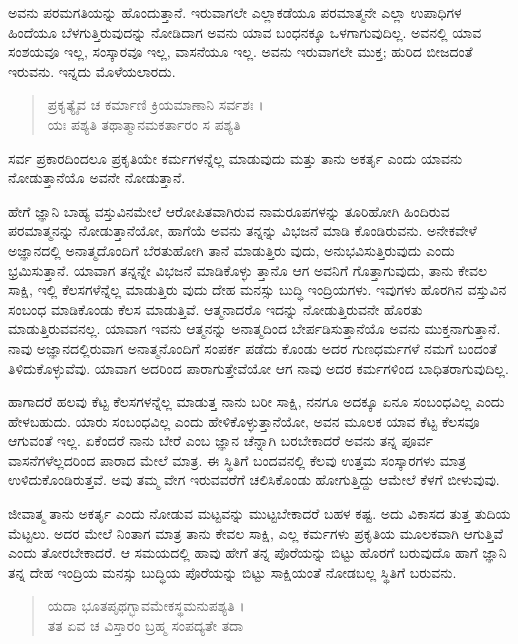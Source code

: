 ಅವನು ಪರಮಗತಿಯನ್ನು ಹೊಂದುತ್ತಾನೆ. ಇರುವಾಗಲೇ ಎಲ್ಲಾಕಡೆಯೂ ಪರಮಾತ್ಮನೇ ಎಲ್ಲಾ ಉಪಾಧಿಗಳ ಹಿಂದೆಯೂ ಬೆಳಗುತ್ತಿರುವುದನ್ನು ನೋಡಿದಾಗ ಅವನು ಯಾವ ಬಂಧನಕ್ಕೂ ಒಳಗಾಗುವುದಿಲ್ಲ. ಅವನಲ್ಲಿ ಯಾವ ಸಂಶಯವೂ ಇಲ್ಲ, ಸಂಸ್ಕಾರವೂ ಇಲ್ಲ, ವಾಸನೆಯೂ ಇಲ್ಲ. ಅವನು ಇರುವಾಗಲೇ ಮುಕ್ತ; ಹುರಿದ ಬೀಜದಂತೆ ಇರುವನು. ಇನ್ನದು ಮೊಳೆಯಲಾರದು.

\begin{verse}
ಪ್ರಕೃತ್ಯೈವ ಚ ಕರ್ಮಾಣಿ ಕ್ರಿಯಮಾಣಾನಿ ಸರ್ವಶಃ ।\\ಯಃ ಪಶ್ಯತಿ ತಥಾತ್ಮಾನಮಕರ್ತಾರಂ ಸ ಪಶ್ಯತಿ 
\end{verse}

{\small ಸರ್ವ ಪ್ರಕಾರದಿಂದಲೂ ಪ್ರಕೃತಿಯೇ ಕರ್ಮಗಳನ್ನೆಲ್ಲ ಮಾಡುವುದು ಮತ್ತು ತಾನು ಅಕರ್ತೃ ಎಂದು ಯಾವನು ನೋಡುತ್ತಾನೆಯೊ ಅವನೇ ನೋಡುತ್ತಾನೆ.}

ಹೇಗೆ ಜ್ಞಾನಿ ಬಾಹ್ಯ ವಸ್ತುವಿನಮೇಲೆ ಆರೋಪಿತವಾಗಿರುವ ನಾಮರೂಪಗಳನ್ನು ತೂರಿಹೋಗಿ ಹಿಂದಿರುವ ಪರಮಾತ್ಮನನ್ನು ನೋಡುತ್ತಾನೆಯೋ, ಹಾಗೆಯೆ ಅವನು ತನ್ನನ್ನು ವಿಭಜನೆ ಮಾಡಿ ಕೊಂಡಿರುವನು. ಅನೇಕವೇಳೆ ಅಜ್ಞಾನದಲ್ಲಿ ಅನಾತ್ಮದೊಂದಿಗೆ ಬೆರತುಹೋಗಿ ತಾನೆ ಮಾಡುತ್ತಿರು ವುದು, ಅನುಭವಿಸುತ್ತಿರುವುದು ಎಂದು ಭ್ರಮಿಸುತ್ತಾನೆ. ಯಾವಾಗ ತನ್ನನ್ನೇ ವಿಭಜನೆ ಮಾಡಿಕೊಳ್ಳು ತ್ತಾನೊ ಆಗ ಅವನಿಗೆ ಗೊತ್ತಾಗುವುದು, ತಾನು ಕೇವಲ ಸಾಕ್ಷಿ, ಇಲ್ಲಿ ಕೆಲಸಗಳೆನ್ನೆಲ್ಲ ಮಾಡುತ್ತಿರು ವುದು ದೇಹ ಮನಸ್ಸು ಬುದ್ಧಿ ಇಂದ್ರಿಯಗಳು. ಇವುಗಳು ಹೊರಗಿನ ವಸ್ತುವಿನ ಸಂಬಂಧ ಮಾಡಿಕೊಂಡು ಕೆಲಸ ಮಾಡುತ್ತಿವೆ. ಆತ್ಮನಾದರೊ ಇದನ್ನು ನೋಡುತ್ತಿರುವನೇ ಹೊರತು ಮಾಡುತ್ತಿರುವವನಲ್ಲ. ಯಾವಾಗ ಇವನು ಆತ್ಮನನ್ನು ಅನಾತ್ಮದಿಂದ ಬೇರ್ಪಡಿಸುತ್ತಾನೆಯೊ ಅವನು ಮುಕ್ತನಾಗುತ್ತಾನೆ. ನಾವು ಅಜ್ಞಾನದಲ್ಲಿರುವಾಗ ಅನಾತ್ಮನೊಂದಿಗೆ ಸಂಪರ್ಕ ಪಡೆದು ಕೊಂಡು ಅದರ ಗುಣಧರ್ಮಗಳೆ ನಮಗೆ ಬಂದಂತೆ ತಿಳಿದುಕೊಳ್ಳುವೆವು. ಯಾವಾಗ ಅದರಿಂದ ಪಾರಾಗುತ್ತೇವೆಯೋ ಆಗ ನಾವು ಅದರ ಕರ್ಮಗಳಿಂದ ಬಾಧಿತರಾಗುವುದಿಲ್ಲ.

ಹಾಗಾದರೆ ಹಲವು ಕೆಟ್ಟ ಕೆಲಸಗಳನ್ನೆಲ್ಲ ಮಾಡುತ್ತ ನಾನು ಬರೀ ಸಾಕ್ಷಿ, ನನಗೂ ಅದಕ್ಕೂ ಏನೂ ಸಂಬಂಧವಿಲ್ಲ ಎಂದು ಹೇಳಬಹುದು. ಯಾರು ಸಂಬಂಧವಿಲ್ಲ ಎಂದು ಹೇಳಿಕೊಳ್ಳುತ್ತಾನೆಯೋ, ಅವನ ಮೂಲಕ ಯಾವ ಕೆಟ್ಟ ಕೆಲಸವೂ ಆಗುವಂತೆ ಇಲ್ಲ. ಏಕೆಂದರೆ ನಾನು ಬೇರೆ ಎಂಬ ಜ್ಞಾನ ಚೆನ್ನಾಗಿ ಬರಬೇಕಾದರೆ ಅವನು ತನ್ನ ಪೂರ್ವ ವಾಸನೆಗಳೆಲ್ಲದರಿಂದ ಪಾರಾದ ಮೇಲೆ ಮಾತ್ರ. ಈ ಸ್ಥಿತಿಗೆ ಬಂದವನಲ್ಲಿ ಕೆಲವು ಉತ್ತಮ ಸಂಸ್ಕಾರಗಳು ಮಾತ್ರ ಉಳಿದುಕೊಂಡಿರುತ್ತವೆ. ಅವು ತಮ್ಮ ವೇಗ ಇರುವವರೆಗೆ ಚಲಿಸಿಕೊಂಡು ಹೋಗುತ್ತಿದ್ದು ಆಮೇಲೆ ಕೆಳಗೆ ಬೀಳುವುವು.

ಜೀವಾತ್ಮ ತಾನು ಅಕರ್ತೃ ಎಂದು ನೋಡುವ ಮಟ್ಟವನ್ನು ಮುಟ್ಟಬೇಕಾದರೆ ಬಹಳ ಕಷ್ಟ. ಅದು ವಿಕಾಸದ ತುತ್ತ ತುದಿಯ ಮೆಟ್ಟಲು. ಅದರ ಮೇಲೆ ನಿಂತಾಗ ಮಾತ್ರ ತಾನು ಕೇವಲ ಸಾಕ್ಷಿ, ಎಲ್ಲ ಕರ್ಮಗಳು ಪ್ರಕೃತಿಯ ಮೂಲಕವಾಗಿ ಆಗುತ್ತಿವೆ ಎಂದು ತೋರಬೇಕಾದರೆ. ಆ ಸಮಯದಲ್ಲಿ ಹಾವು ಹೇಗೆ ತನ್ನ ಪೊರೆಯನ್ನು ಬಿಟ್ಟು ಹೊರಗೆ ಬರುವುದೊ ಹಾಗೆ ಜ್ಞಾನಿ ತನ್ನ ದೇಹ ಇಂದ್ರಿಯ ಮನಸ್ಸು ಬುದ್ಧಿಯ ಪೊರೆಯನ್ನು ಬಿಟ್ಟು ಸಾಕ್ಷಿಯಂತೆ ನೋಡಬಲ್ಲ ಸ್ಥಿತಿಗೆ ಬರುವನು.

\begin{verse}
ಯದಾ ಭೂತಪೃಥಗ್ಭಾವಮೇಕಸ್ಥಮನುಪಶ್ಯತಿ ।\\ತತ ಏವ ಚ ವಿಸ್ತಾರಂ ಬ್ರಹ್ಮ ಸಂಪದ್ಯತೇ ತದಾ 
\end{verse}

